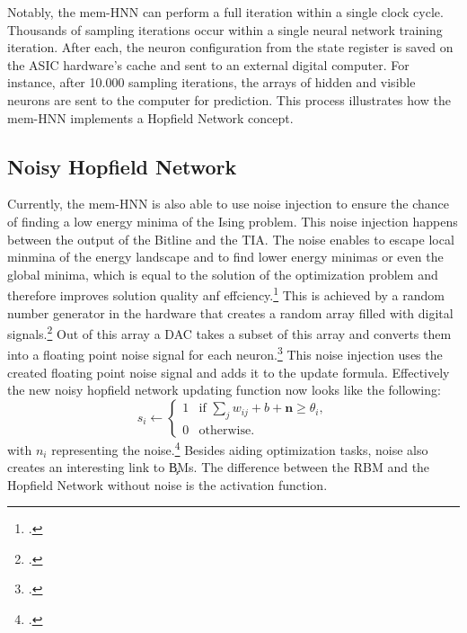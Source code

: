 Notably, the \ac{mem-HNN} can perform a full iteration within a single clock cycle.
Thousands of sampling iterations occur within a single neural network training iteration.
After each, the neuron configuration from the state register is saved on the \ac{ASIC} hardware's cache and sent to an external digital computer.
For instance, after 10.000 sampling iterations, the arrays of hidden and visible neurons are sent to the computer for prediction.
This process illustrates how the \ac{mem-HNN} implements a Hopfield Network concept.

\subsection{Noisy Hopfield Network}

Currently, the \ac{mem-HNN} is also able to use noise injection to ensure the chance of finding a low energy minima of the Ising problem.
This noise injection happens between the output of the Bitline and the \ac{TIA}. 
The noise enables to escape local minmina of the energy landscape and to find lower energy minimas or even the global minima, which is equal to the solution of the optimization problem and therefore improves solution quality anf effciency.\footcite[cf.][410]{caiPowerefficientCombinatorialOptimization2020} 
This is achieved by a random number generator in the hardware that creates a random array filled with digital signals.\footcite[cf.][22]{caiHarnessingIntrinsicNoise2019}
Out of this array a \ac{DAC} takes a subset of this array and converts them into a floating point noise signal for each neuron.\footcite[cf.][3]{hizzaniMemristorbasedHardwareAlgorithms2023}
This noise injection uses the created floating point noise signal and adds it to the update formula.
Effectively the new noisy hopfield network updating function now looks like the following: 
\begin{equation}
    s_i \leftarrow 
    \begin{cases} 
    1 & \text{if } \sum_j w_{ij}  + b + \mathbf{n} \geq \theta_i, \\
    0 & \text{otherwise}.
    \end{cases}
    \label{noisy_update_HNN_formula}
\end{equation}
with \(n_i\) representing the noise.\footcite[cf.][410]{caiPowerefficientCombinatorialOptimization2020} 
Besides aiding optimization tasks, noise also creates an interesting link to \c{BM}s.
The difference between the \ac{RBM} and the Hopfield Network without noise is the activation function.
